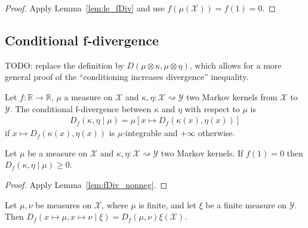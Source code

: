 \begin{proof}\leanok
{}
Apply Lemma~\ref{lem:le_fDiv} and use $f(\mu(\mathcal X)) = f(1) = 0$.
\end{proof}



\subsection{Conditional f-divergence}

TODO: replace the definition by $D(\mu \otimes \kappa, \mu \otimes \eta)$, which allows for a more general proof of the ``conditioning increases divergence'' inequality.

\begin{definition}
  \label{def:condFDiv}
  \leanok
  Let $f : \mathbb{R} \to \mathbb{R}$, $\mu$ a measure on $\mathcal X$ and $\kappa, \eta : \mathcal X \rightsquigarrow \mathcal Y$ two Markov kernels from $\mathcal X$ to $\mathcal Y$. The conditional f-divergence between $\kappa$ and $\eta$ with respect to $\mu$ is
  \begin{align*}
  D_f(\kappa, \eta \mid \mu) = \mu\left[x \mapsto D_f(\kappa(x), \eta(x))\right]
  \end{align*}
  if $x \mapsto D_f(\kappa(x), \eta(x))$ is $\mu$-integrable and $+\infty$ otherwise.
\end{definition}


\begin{lemma}
  \label{lem:condFDiv_nonneg}
  \leanok
  Let $\mu$ be a measure on $\mathcal X$ and $\kappa, \eta : \mathcal X \rightsquigarrow \mathcal Y$ two Markov kernels. If $f(1) = 0$ then $D_f(\kappa, \eta \mid \mu) \ge 0$.
\end{lemma}

\begin{proof}\leanok
{}
Apply Lemma~\ref{lem:fDiv_nonneg}.
\end{proof}


\begin{lemma}
  \label{lem:condFDiv_const}
  \leanok
  Let $\mu, \nu$ be measures on $\mathcal X$, where $\mu$ is finite, and let $\xi$ be a finite measure on $\mathcal Y$.
  Then $D_f(x \mapsto \mu, x \mapsto \nu \mid \xi) = D_f(\mu, \nu) \xi (\mathcal X)$.
\end{lemma}

